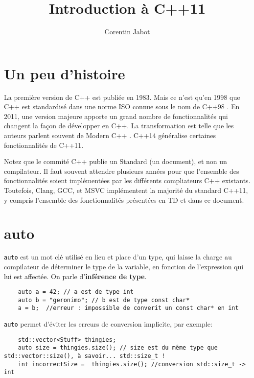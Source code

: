 \documentclass[8pt]{article}
\title{\textbf{Introduction à C++11}}
\author{Corentin Jabot}
\date{}
\begin{document}
\NoAutoSpacing


\makeatletter
\begin{center}%
{\LARGE \@title \par}
\end{center}%
\makeatother

\section*{Un peu d'histoire}

La première version de C++ est publiée en 1983. Mais ce n’est qu’en 1998 que C++ est standardisé dans une norme ISO connue sous le nom de \og C++98 \fg{}. En 2011, une version majeure apporte un grand nombre de fonctionnalités qui changent la façon de développer en C++.
La transformation est telle que les auteurs parlent souvent de \og Modern C++ \fg{}.
C++14 généralise certaines fonctionnalités de C++11.

Notez que le commité C++ publie un \og Standard \fg{} (un document), et non un compilateur. Il faut souvent attendre plusieurs années pour que l'ensemble des fonctionnalités soient implémentées par les différents compliateurs C++ existants. Toutefois, Clang, GCC, et MSVC implémentent la majorité du standard C++11, y compris l'ensemble des fonctionnalités présentées en TD et dans ce document.


\section*{auto}

\lstinline{auto} est un mot clé utilisé en lieu et place d'un type, qui laisse la charge au compilateur de déterminer le type de la variable, en fonction de l’expression qui lui est affectée. On parle d'\textbf{inférence de type}.

\begin{lstlisting}
	auto a = 42; // a est de type int
	auto b = "geronimo"; // b est de type const char*
	a = b;  //erreur : impossible de converit un const char* en int
\end{lstlisting}

\lstinline{auto} permet d'éviter les erreurs de conversion implicite, par exemple:
\begin{lstlisting}
	std::vector<Stuff> thingies;
	auto size = thingies.size(); // size est du même type que std::vector::size(), à savoir... std::size_t !
	int incorrectSize =  thingies.size(); //conversion std::size_t -> int
\end{lstlisting}
\end{document}
